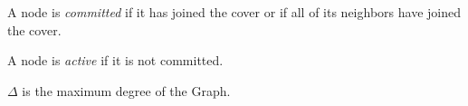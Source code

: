 \begin{ldef}
A node is {\em committed} if it has joined the cover or if all of its neighbors have joined the cover.
\end{ldef}
\begin{ldef}
A node is {\em active} if it is not committed.
\end{ldef}
\begin{ldef}
$\Delta$ is the maximum degree of the Graph.
\end{ldef}
